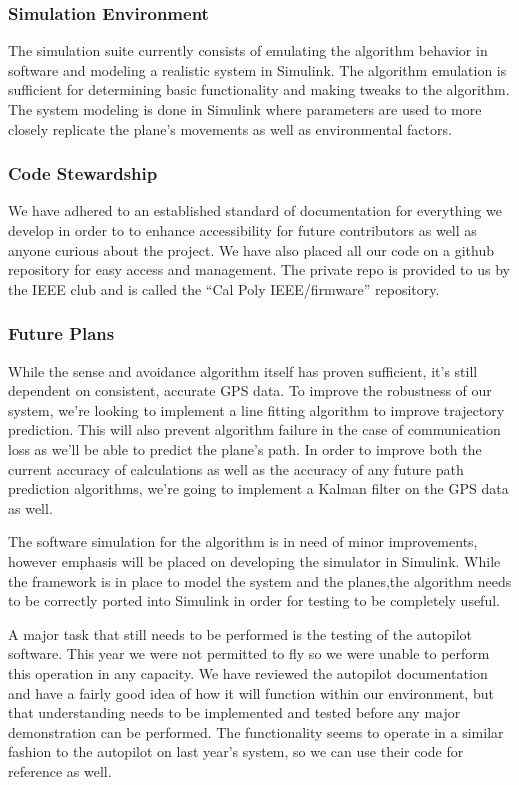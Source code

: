 \documentclass[12pt]{article}
\begin{document}
\subsubsection{Simulation Environment}
The simulation suite currently consists of emulating the algorithm behavior in software and modeling a realistic system in Simulink. The algorithm emulation is sufficient for determining basic functionality and making tweaks to the algorithm. The system modeling is done in Simulink where parameters are used to more closely replicate the plane's movements as well as environmental factors.

\subsubsection{Code Stewardship}
We have adhered to an established standard of documentation for everything we develop in order to to enhance accessibility for future contributors as well as anyone curious about the project.  We have also placed all our code on a github repository for easy access and management. The private repo is provided to us by the IEEE club and is called the “Cal Poly IEEE/firmware” repository.

\subsubsection{Future Plans}
While the sense and avoidance algorithm itself has proven sufficient, it's still dependent on consistent, accurate GPS data. To improve the robustness of our system, we're looking to implement a line fitting algorithm to improve trajectory prediction. This will also prevent algorithm failure in the case of communication loss as we'll be able to predict the plane's path. In order to improve both the current accuracy of calculations as well as the accuracy of any future path prediction algorithms, we're going to implement a Kalman filter on the GPS data as well.

The software simulation for the algorithm is in need of minor improvements, however emphasis will be placed on developing the simulator in Simulink. While the framework is in place to model the system and the planes,the algorithm needs to be correctly ported into Simulink in order for testing to be completely useful.

A major task that still needs to be performed is the testing of the autopilot software. This year we were not permitted to fly so we were unable to perform this operation in any capacity. We have reviewed the autopilot documentation and have a fairly good idea of how it will function within our environment, but that understanding needs to be implemented and tested before any major demonstration can be performed. The functionality seems to operate in a similar fashion to the autopilot on last year's system, so we can use their code for reference as well.
\end{document}
